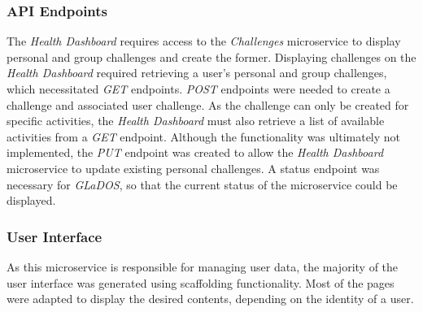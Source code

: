 \subsubsection{API Endpoints}
\par
The \textit{Health Dashboard} requires access to the \textit{Challenges} microservice to display personal and group challenges and create the former. Displaying challenges on the \textit{Health Dashboard} required retrieving a user's personal and group challenges, which necessitated \textit{GET} endpoints. \textit{POST} endpoints were needed to create a challenge and associated user challenge. As the challenge can only be created for specific activities, the \textit{Health Dashboard} must also retrieve a list of available activities from a \textit{GET} endpoint.
Although the functionality was ultimately not implemented, the \textit{PUT} endpoint was created to allow the \textit{Health Dashboard} microservice to update existing personal challenges.
A status endpoint was necessary for \textit{GLaDOS}, so that the current status of the microservice could be displayed.

\subsubsection{User Interface}
\par
As this microservice is responsible for managing user data, the majority of the user interface was generated using scaffolding functionality. Most of the pages were adapted to display the desired contents, depending on the identity of a user.
